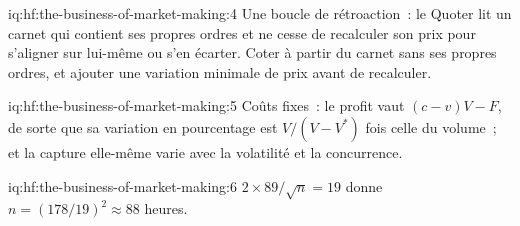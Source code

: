 \begin{solution}{iq:hf:the-business-of-market-making:4}
Une boucle de rétroaction~: le Quoter lit un carnet qui contient ses propres ordres et ne cesse de recalculer son prix pour s'aligner sur lui-même ou s'en écarter. Coter à partir du carnet sans
ses propres ordres, et ajouter une variation minimale de prix avant de recalculer.
\end{solution}

\begin{solution}{iq:hf:the-business-of-market-making:5}
Coûts fixes~: le profit vaut $(c-v)V-F$, de sorte que sa variation en pourcentage est $V/(V-V^\ast)$ fois celle du volume~; et la capture elle-même varie avec la volatilité et
la concurrence.
\end{solution}

\begin{solution}{iq:hf:the-business-of-market-making:6}
$2\times89/\sqrt n=19$ donne $n=(178/19)^2\approx88$ heures.
\end{solution}
